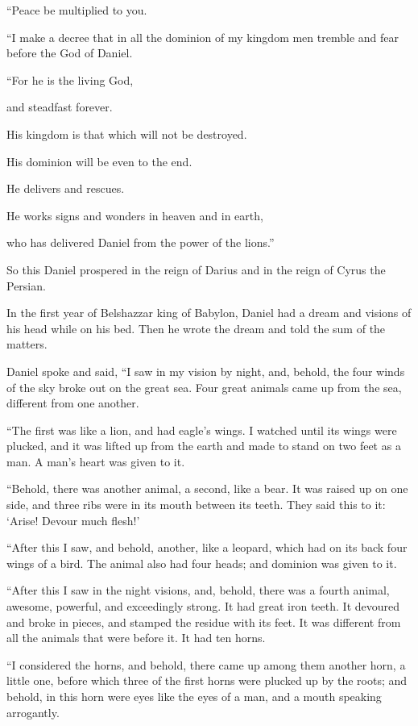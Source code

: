 “Peace be multiplied to you.

\myverse{}“I make a decree that in all the dominion of my kingdom
men tremble and fear before the God of Daniel.

“For he is the living God,

and steadfast forever.

His kingdom is that which will not be destroyed.

His dominion will be even to the end.

\myverse{}He delivers and rescues.

He works signs and wonders in heaven and in earth,

who has delivered Daniel from the power of the lions.”

\myverse{}So this Daniel prospered in the reign of Darius and in the reign
of Cyrus the Persian.


\mychapter{} \myverse*{}In the first year of Belshazzar king of Babylon, Daniel had a dream
and visions of his head while on his bed. Then he wrote the dream and told the sum of the matters.

\myverse{}Daniel spoke and said, “I saw in my vision by night, and, behold,
the four winds of the sky broke out on the great sea.
\myverse{}Four great animals came up from the sea, different from one another.

\myverse{}“The first was like a lion, and had eagle’s wings. I watched until
its wings were plucked, and it was lifted up from the earth and made to stand on two feet as a man. A
man’s heart was given to it.

\myverse{}“Behold, there was another animal, a second, like a bear. It was
raised up on one side, and three ribs were in its mouth between its teeth. They said this to it: ‘Arise!
Devour much flesh!’

\myverse{}“After this I saw, and behold, another, like a leopard, which had
on its back four wings of a bird. The animal also had four heads; and dominion was given to it.

\myverse{}“After this I saw in the night visions, and, behold, there was
a fourth animal, awesome, powerful, and exceedingly strong. It had great iron teeth. It devoured and broke
in pieces, and stamped the residue with its feet. It was different from all the animals that were before
it. It had ten horns.

\myverse{}“I considered the horns, and behold, there came up among them another
horn, a little one, before which three of the first horns were plucked up by the roots; and behold, in
this horn were eyes like the eyes of a man, and a mouth speaking arrogantly.

